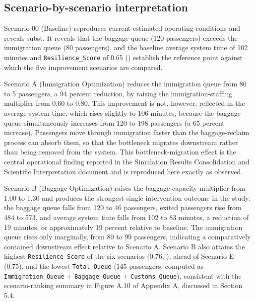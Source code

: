 \subsection{Scenario-by-scenario interpretation}
\label{subsec:scenario-by-scenario-interpretation}

Scenario 00 (Baseline) reproduces current estimated operating conditions and reveals subst. It reveals that the baggage queue (120 passengers) exceeds the immigration queue (80 passengers), and the baseline average system time of 102 minutes and \nolinkurl{Resilience_Score} of 0.65 () establish the reference point against which the five improvement scenarios are compared.

Scenario A (Immigration Optimization) reduces the immigration queue from 80 to 5 passengers, a 94 percent reduction, by raising the immigration-staffing multiplier from 0.60 to 0.80. This improvement is not, however, reflected in the average system time, which rises slightly to 106 minutes, because the baggage queue simultaneously increases from 120 to 198 passengers (a 65 percent increase). Passengers move through immigration faster than the baggage-reclaim process can absorb them, so that the bottleneck migrates downstream rather than being removed from the system. This bottleneck-migration effect is the central operational finding reported in the Simulation Results Consolidation and Scientific Interpretation document and is reproduced here exactly as observed.

Scenario B (Baggage Optimization) raises the baggage-capacity multiplier from 1.00 to 1.30 and produces the strongest single-intervention outcome in the study: the baggage queue falls from 120 to 46 passengers, exited passengers rise from 484 to 573, and average system time falls from 102 to 83 minutes, a reduction of 19 minutes, or approximately 19 percent relative to baseline. The immigration queue rises only marginally, from 80 to 99 passengers, indicating a comparatively contained downstream effect relative to Scenario A. Scenario B also attains the highest \nolinkurl{Resilience_Score} of the six scenarios (0.76, ), ahead of Scenario E (0.75), and the lowest \nolinkurl{Total_Queue} (145 passengers, computed as \nolinkurl{Immigration_Queue} + \nolinkurl{Baggage_Queue} + \nolinkurl{Customs_Queue}), consistent with the scenario-ranking summary in Figure A.10 of Appendix A, discussed in Section 5.4.

